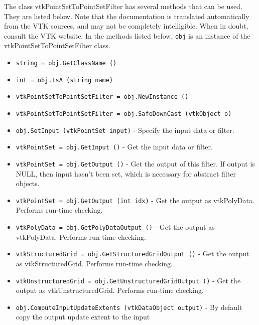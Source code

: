 The class vtkPointSetToPointSetFilter has several methods that can be used.
  They are listed below.
Note that the documentation is translated automatically from the VTK sources,
and may not be completely intelligible.  When in doubt, consult the VTK website.
In the methods listed below, \verb|obj| is an instance of the vtkPointSetToPointSetFilter class.
\begin{itemize}
\item  \verb|string = obj.GetClassName ()|

\item  \verb|int = obj.IsA (string name)|

\item  \verb|vtkPointSetToPointSetFilter = obj.NewInstance ()|

\item  \verb|vtkPointSetToPointSetFilter = obj.SafeDownCast (vtkObject o)|

\item  \verb|obj.SetInput (vtkPointSet input)| -  Specify the input data or filter.

\item  \verb|vtkPointSet = obj.GetInput ()| -  Get the input data or filter.

\item  \verb|vtkPointSet = obj.GetOutput ()| -  Get the output of this filter. If output is NULL, then input hasn't been
 set, which is necessary for abstract filter objects.

\item  \verb|vtkPointSet = obj.GetOutput (int idx)| -  Get the output as vtkPolyData. Performs run-time checking.

\item  \verb|vtkPolyData = obj.GetPolyDataOutput ()| -  Get the output as vtkPolyData. Performs run-time checking.

\item  \verb|vtkStructuredGrid = obj.GetStructuredGridOutput ()| -  Get the output as vtkStructuredGrid. Performs run-time checking.

\item  \verb|vtkUnstructuredGrid = obj.GetUnstructuredGridOutput ()| -  Get the output as vtkUnstructuredGrid. Performs run-time checking.

\item  \verb|obj.ComputeInputUpdateExtents (vtkDataObject output)| -  By default copy the output update extent to the input

\end{itemize}
